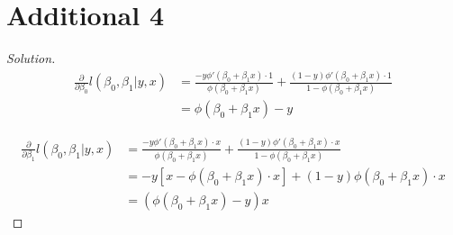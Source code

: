 \documentclass{article}
\newenvironment{solution}
  {\renewcommand\qedsymbol{$\blacksquare$}\begin{proof}[Solution]$ $}
  {\end{proof}}
\begin{document}
\section{Additional 4}
\begin{solution}
    \begin{align*}
    \frac{\partial }{\partial \beta_0} l(\beta_0, \beta_1 | y, x) &= \frac{-y \phi'(\beta_0 + \beta_1 x)\cdot 1}{\phi(\beta_0 + \beta_1 x)} + \frac{(1-y)\phi'(\beta_0 + \beta_1 x)\cdot 1}{1-\phi(\beta_0 + \beta_1 x)} \\
    &= \phi(\beta_0 + \beta_1 x) - y
    \end{align*}

    \begin{align*}
    \frac{\partial }{\partial \beta_1} l(\beta_0, \beta_1 | y, x) &= \frac{-y \phi'(\beta_0 + \beta_1 x)\cdot x}{\phi(\beta_0 + \beta_1 x)} + \frac{(1-y)\phi'(\beta_0 + \beta_1 x)\cdot x}{1-\phi(\beta_0 + \beta_1 x)} \\
    &= -y[x-\phi(\beta_0 + \beta_1 x)\cdot x] + (1-y)\phi(\beta_0 + \beta_1 x)\cdot x \\
    &= (\phi(\beta_0 + \beta_1 x) - y)x
    \end{align*}
\end{solution}
\end{document}

